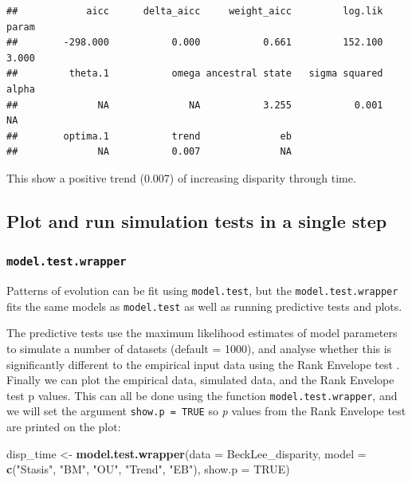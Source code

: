 \documentclass[
]{book}
\newenvironment{Shaded}{\begin{snugshade}}{\end{snugshade}}
\newcommand{\DataTypeTok}[1]{\textcolor[rgb]{0.13,0.29,0.53}{#1}}
\newcommand{\KeywordTok}[1]{\textcolor[rgb]{0.13,0.29,0.53}{\textbf{#1}}}
\newcommand{\NormalTok}[1]{#1}
\newcommand{\OtherTok}[1]{\textcolor[rgb]{0.56,0.35,0.01}{#1}}
\newcommand{\StringTok}[1]{\textcolor[rgb]{0.31,0.60,0.02}{#1}}
\begin{document}
\begin{verbatim}
##            aicc      delta_aicc     weight_aicc         log.lik           param 
##        -298.000           0.000           0.661         152.100           3.000 
##         theta.1           omega ancestral state   sigma squared           alpha 
##              NA              NA           3.255           0.001              NA 
##        optima.1           trend              eb 
##              NA           0.007              NA
\end{verbatim}

This show a positive trend (0.007) of increasing disparity through time.

\hypertarget{plot-and-run-simulation-tests-in-a-single-step}{%
\subsection{Plot and run simulation tests in a single step}\label{plot-and-run-simulation-tests-in-a-single-step}}

\hypertarget{model.test.wrapper}{%
\subsubsection{\texorpdfstring{\texttt{model.test.wrapper}}{model.test.wrapper}}\label{model.test.wrapper}}

Patterns of evolution can be fit using \texttt{model.test}, but the \texttt{model.test.wrapper} fits the same models as \texttt{model.test} as well as running predictive tests and plots.

The predictive tests use the maximum likelihood estimates of model parameters to simulate a number of datasets (default = 1000), and analyse whether this is significantly different to the empirical input data using the Rank Envelope test \citep{murrell2018global}.
Finally we can plot the empirical data, simulated data, and the Rank Envelope test p values.
This can all be done using the function \texttt{model.test.wrapper}, and we will set the argument \texttt{show.p\ =\ TRUE} so \emph{p} values from the Rank Envelope test are printed on the plot:

\begin{Shaded}
\begin{Highlighting}[]
\NormalTok{disp\_time \textless{}{-}}\StringTok{ }\KeywordTok{model.test.wrapper}\NormalTok{(}\DataTypeTok{data =}\NormalTok{ BeckLee\_disparity,}
                    \DataTypeTok{model =} \KeywordTok{c}\NormalTok{(}\StringTok{"Stasis"}\NormalTok{, }\StringTok{"BM"}\NormalTok{, }\StringTok{"OU"}\NormalTok{, }\StringTok{"Trend"}\NormalTok{, }\StringTok{"EB"}\NormalTok{),}
                                \DataTypeTok{show.p =} \OtherTok{TRUE}\NormalTok{)}
\end{Highlighting}
\end{Shaded}
\end{document}
